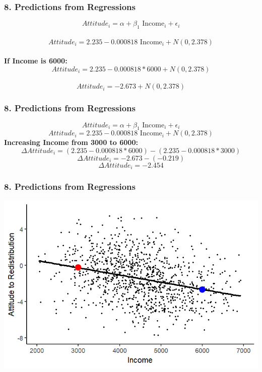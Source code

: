 \documentclass[xcolor=x11names,compress]{beamer}\usepackage[]{graphicx}\usepackage[]{color}
\makeatletter
\def\maxwidth{ %
  \ifdim\Gin@nat@width>\linewidth
    \linewidth
  \else
    \Gin@nat@width
  \fi
}
\newenvironment{knitrout}{}{} %
\renewcommand{\(}{\begin{columns}}
\renewcommand{\)}{\end{columns}}
\newcommand{\<}[1]{\begin{column}{#1}}
\renewcommand{\>}{\end{column}}
\makeatother
\begin{document}
\begin{frame}
\frametitle{8. Predictions from Regressions}
$$Attitude_i = \alpha + \beta_1 \text{ Income}_i + \epsilon_i$$ \\
$$Attitude_i = 2.235 - 0.000818 \text{ Income}_i + N(0,2.378)$$ \\
\textbf{If Income is 6000:}  \\
$$Attitude_i = 2.235-0.000818*6000 + N(0,2.378)$$ \\
$$Attitude_i = -2.673 + N(0,2.378)$$
\end{frame}

\begin{frame}
\frametitle{8. Predictions from Regressions}
$$Attitude_i = \alpha + \beta_1 \text{ Income}_i + \epsilon_i$$
$$Attitude_i = 2.235 - 0.000818 \text{ Income}_i + N(0,2.378)$$
\textbf{Increasing Income from 3000 to 6000:} \\
$$\Delta Attitude_i = (2.235-0.000818*6000) - (2.235-0.000818*3000)$$
$$\Delta Attitude_i = -2.673 - (-0.219)$$
$$\Delta Attitude_i = -2.454$$
\end{frame}

\begin{frame}
\frametitle{8. Predictions from Regressions}
\begin{knitrout}
\color{fgcolor}
\includegraphics[width=\maxwidth]{figure/predictions1-1} 

\end{knitrout}
\end{frame}
\end{document}
